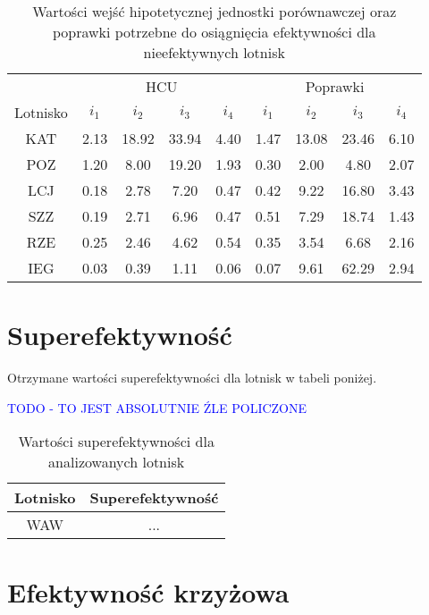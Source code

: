 \documentclass[a4paper,12pt]{article}
\begin{document}
\begin{table}[H]
    \centering
    \begin{tabular}{c|cccc|cccc}
    \hline
        & \multicolumn{4}{c|}{HCU} & \multicolumn{4}{c}{Poprawki}  \\
         Lotnisko & $i_1$ & $i_2$ & $i_3$ & $i_4$ & $i_1$ & $i_2$ & $i_3$ & $i_4$ \\ \hline
         KAT & 2.13 & 18.92 & 33.94 & 4.40 & 1.47 & 13.08 & 23.46 & 6.10 \\
POZ & 1.20 & 8.00 & 19.20 & 1.93 & 0.30 & 2.00 & 4.80 & 2.07 \\
LCJ & 0.18 & 2.78 & 7.20 & 0.47 & 0.42 & 9.22 & 16.80 & 3.43 \\
SZZ & 0.19 & 2.71 & 6.96 & 0.47 & 0.51 & 7.29 & 18.74 & 1.43 \\
RZE & 0.25 & 2.46 & 4.62 & 0.54 & 0.35 & 3.54 & 6.68 & 2.16 \\
IEG & 0.03 & 0.39 & 1.11 & 0.06 & 0.07 & 9.61 & 62.29 & 2.94 \\
    \end{tabular}
    \caption{Wartości wejść hipotetycznej jednostki porównawczej oraz poprawki potrzebne do osiągnięcia efektywności dla nieefektywnych lotnisk }
    \label{tab:airports-hcu-and-improvements}
\end{table}

\section{Superefektywność}

Otrzymane wartości superefektywności dla lotnisk w tabeli poniżej.

\textcolor{blue}{TODO - TO JEST ABSOLUTNIE ŹLE POLICZONE}

\begin{table}[H]
    \centering
    \begin{tabular}{c|c}
    \hline
         Lotnisko & Superefektywność  \\ \hline
         WAW & ...\\
         \hline
    \end{tabular}
    \caption{Wartości superefektywności dla analizowanych lotnisk}
    \label{tab:airports-super-efficiency}
\end{table}

\section{Efektywność krzyżowa}
\end{document}
